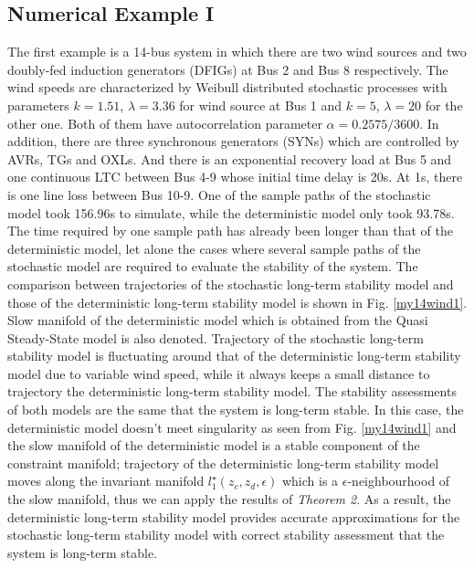 \documentclass[journal]{IEEEtran}
\newcommand{\ee}{\epsilon}
\begin{document}
\subsection{Numerical Example I}
The first example is a 14-bus system in which there are two wind sources and two doubly-fed induction generators (DFIGs) at Bus 2 and Bus 8 respectively. The wind speeds are characterized by Weibull distributed stochastic processes with parameters $k=1.51$, $\lambda=3.36$ for wind source at Bus 1 and $k=5$, $\lambda=20$ for the other one. Both of them have autocorrelation parameter $\alpha=0.2575/3600$\cite{Milano:2013_1}. In addition, there are three synchronous generators (SYNs) which are controlled by AVRs, TGs and OXLs. And there is an exponential recovery load at Bus 5 and one continuous LTC between Bus 4-9 whose initial time delay is 20s. At 1s, there is one line loss between Bus 10-9. 
One of the sample paths of the stochastic model took 156.96s to simulate, while the deterministic model only took 93.78s. The time required by one sample path has already been longer than that of the deterministic model, let alone the cases where several sample paths of the stochastic model are required to evaluate the stability of the system. The comparison between trajectories of the stochastic long-term stability model and those of the deterministic long-term stability model is shown in Fig. \ref{my14wind1}. Slow manifold of the deterministic model which is obtained from the Quasi Steady-State model \cite{Cutsem:book} is also denoted. Trajectory of the stochastic long-term stability model is fluctuating around that of the deterministic long-term stability model due to variable wind speed, while it always keeps a small distance to trajectory the deterministic long-term stability model. The stability assessments of both models are the same that the system is long-term stable. In this case, the deterministic model doesn't meet singularity as seen from Fig. \ref{my14wind1} and the slow manifold of the deterministic model is a stable component of the constraint manifold; trajectory of the deterministic long-term stability model moves along the invariant manifold $l_1^\star(z_c,z_d,\ee)$ which is a $\ee$-neighbourhood of the slow manifold, thus we can apply the results of \textit{Theorem 2}.  As a result, the deterministic long-term stability model provides accurate approximations for the stochastic long-term stability model with correct stability assessment that the system is long-term stable.
\end{document}
